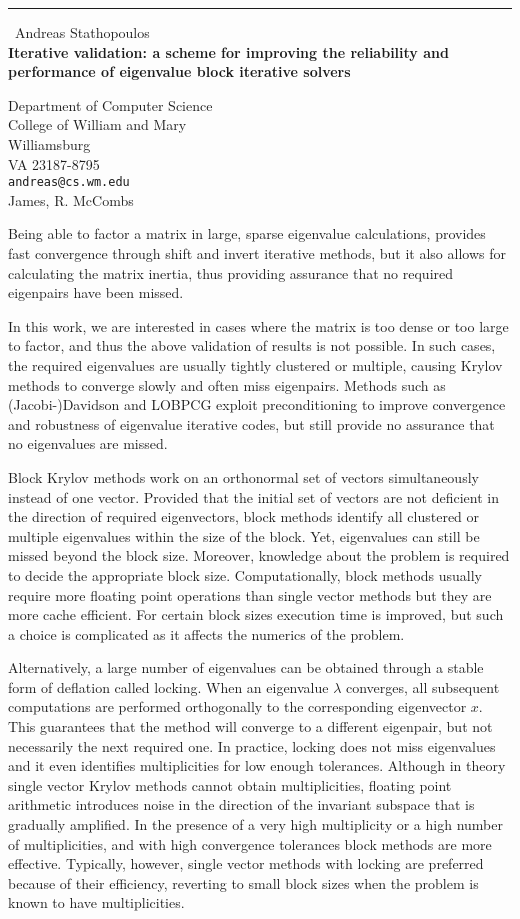\documentclass{report}
\begin{document}
\begin{center}
\rule{6in}{1pt} \
{\large Andreas Stathopoulos \\
{\bf Iterative validation: a scheme for improving the reliability and performance of eigenvalue block iterative solvers}}

Department of Computer Science  \\           College of William and Mary \\ Williamsburg \\ VA 23187-8795
\\
{\tt andreas@cs.wm.edu}\\
James, R. McCombs\end{center}

Being able to factor a matrix in large, sparse eigenvalue calculations,
provides fast convergence through shift and invert iterative methods,
but it also allows for calculating the matrix inertia,
thus providing assurance that no required eigenpairs have been missed.

In this work, we are interested in cases where the matrix is too dense
or too large to factor, and thus the above validation of results is
not possible.
In such cases, the required eigenvalues are usually
tightly clustered or multiple, causing Krylov methods to converge
slowly and often miss eigenpairs.
Methods such as (Jacobi-)Davidson and LOBPCG
exploit preconditioning to improve convergence and robustness of
eigenvalue iterative codes, but still provide no assurance
that no eigenvalues are missed.

Block Krylov methods work on an orthonormal set of vectors simultaneously
instead of one vector.
Provided that the initial set of vectors are not deficient in the direction
of required eigenvectors, block methods identify all clustered or
multiple eigenvalues within the size of the block.
Yet, eigenvalues can still be missed beyond the block size.
Moreover, knowledge about the problem is required to decide the
appropriate block size.
Computationally, block methods usually require more floating point
operations than single vector methods but they are more cache efficient.
For certain block sizes execution time is improved, but such
a choice is complicated as it affects the numerics of the problem.


Alternatively, a large number of eigenvalues can be
obtained through a stable form of deflation called locking.
When an eigenvalue $\lambda$ converges, all subsequent
computations are performed orthogonally to the corresponding
eigenvector $x$.
This guarantees that the method will converge to a different eigenpair,
but not necessarily the next required one.
In practice, locking does not miss eigenvalues and it even identifies
multiplicities for low enough tolerances.
Although in theory single vector Krylov methods cannot obtain
multiplicities, floating point arithmetic introduces noise in the direction
of the invariant subspace that is gradually amplified.
In the presence of a very high multiplicity or a high number of multiplicities,
and with high convergence tolerances
block methods are more effective.
Typically, however, single vector methods with locking are preferred
because of their efficiency, reverting to small block sizes when the
problem is known to have multiplicities.
\end{document}
